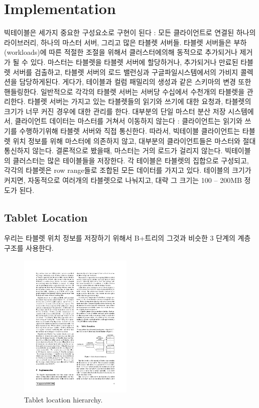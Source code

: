 \documentclass[twocolumn]{article}
\begin{document}
\section{Implementation}
빅테이블은 세가지 중요한 구성요소로 구현이 된다 : 모든 클라이언트로 연결된 하나의 라이브러리, 하나의 마스터 서버, 그리고 많은 타블렛 서버들.
타블렛 서버들은 부하(workloads)에 따른 적절한 조절을 위해서 클러스터에의해 동적으로 추가되거나 제거가 될 수 있다. 마스터는 타블렛을 타블렛 서버에 할당하거나, 추가되거나 만료된 타블렛 서버를 검출하고, 타블렛 서버의 로드 밸런싱과 구글파일시스템에서의 가비지 콜렉션을 담당하게된다. 게다가, 테이블과 컬럼 패밀리의 생성과 같은 스키마의 변경 또한 핸들링한다. 일반적으로 각각의 타블렛 서버는 서버당 수십에서 수천개의 타블렛을 관리한다. 타블렛 서버는 가지고 있는 타블렛들의 읽기와 쓰기에 대한 요청과, 타블렛의 크기가 너무 커진 경우에 대한 관리를 한다.
대부분의 단일 마스터 분산 저장 시스템에서, 클라이언트 데이터는 마스터를 거쳐서 이동하지 않는다 : 클라이언트는 읽기와 쓰기를 수행하기위해 타블렛 서버와 직접 통신한다. 따라서, 빅테이블 클라이언트는 타블렛 위치 정보를 위해 마스터에 의존하지 않고, 대부분의 클라이언트들은 마스터와 절대 통신하지 않는다. 결론적으로 봤을때, 마스터는 거의 로드가 걸리지 않는다.
빅테이블의 클러스터는 많은 테이블들을 저장한다. 각 테이블은 타블렛의 집합으로 구성되고, 각각의 타블렛은 row range들로 조합된 모든 데이터를 가지고 있다. 테이블의 크기가 커지면, 자동적으로 여러개의 타블렛으로 나눠지고, 대략 그 크기는 100 -- 200MB 정도가 된다.
 
\subsection{Tablet Location}
우리는 타블렛 위치 정보를 저장하기 위해서 B+트리의 그것과 비슷한 3 단계의 계층구조를 사용한다.

\begin{figure}[htb]
        \centering
        \includegraphics[width=0.48\textwidth]{tablet}
        \caption{\small Tablet location hierarchy.}
        \label{fig02}
\end{figure}
\end{document}
